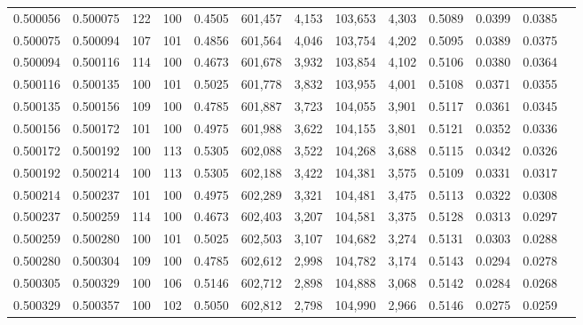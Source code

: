 \begin{tabular}{rrrrrrrrrrrrr}
0.500056 & 0.500075 &   122 & 100 &                                     0.4505 & 601,457 &   4,153 & 103,653 &   4,303 & 0.5089 & 0.0399 & 0.0385 \\
0.500075 & 0.500094 &   107 & 101 &                                     0.4856 & 601,564 &   4,046 & 103,754 &   4,202 & 0.5095 & 0.0389 & 0.0375 \\
0.500094 & 0.500116 &   114 & 100 &                                     0.4673 & 601,678 &   3,932 & 103,854 &   4,102 & 0.5106 & 0.0380 & 0.0364 \\
0.500116 & 0.500135 &   100 & 101 &                                     0.5025 & 601,778 &   3,832 & 103,955 &   4,001 & 0.5108 & 0.0371 & 0.0355 \\
0.500135 & 0.500156 &   109 & 100 &                                     0.4785 & 601,887 &   3,723 & 104,055 &   3,901 & 0.5117 & 0.0361 & 0.0345 \\
0.500156 & 0.500172 &   101 & 100 &                                     0.4975 & 601,988 &   3,622 & 104,155 &   3,801 & 0.5121 & 0.0352 & 0.0336 \\
0.500172 & 0.500192 &   100 & 113 &                                     0.5305 & 602,088 &   3,522 & 104,268 &   3,688 & 0.5115 & 0.0342 & 0.0326 \\
0.500192 & 0.500214 &   100 & 113 &                                     0.5305 & 602,188 &   3,422 & 104,381 &   3,575 & 0.5109 & 0.0331 & 0.0317 \\
0.500214 & 0.500237 &   101 & 100 &                                     0.4975 & 602,289 &   3,321 & 104,481 &   3,475 & 0.5113 & 0.0322 & 0.0308 \\
0.500237 & 0.500259 &   114 & 100 &                                     0.4673 & 602,403 &   3,207 & 104,581 &   3,375 & 0.5128 & 0.0313 & 0.0297 \\
0.500259 & 0.500280 &   100 & 101 &                                     0.5025 & 602,503 &   3,107 & 104,682 &   3,274 & 0.5131 & 0.0303 & 0.0288 \\
0.500280 & 0.500304 &   109 & 100 &                                     0.4785 & 602,612 &   2,998 & 104,782 &   3,174 & 0.5143 & 0.0294 & 0.0278 \\
0.500305 & 0.500329 &   100 & 106 &                                     0.5146 & 602,712 &   2,898 & 104,888 &   3,068 & 0.5142 & 0.0284 & 0.0268 \\
0.500329 & 0.500357 &   100 & 102 &                                     0.5050 & 602,812 &   2,798 & 104,990 &   2,966 & 0.5146 & 0.0275 & 0.0259 \\

\end{tabular}

